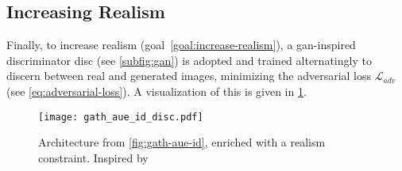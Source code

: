\subsection{Increasing Realism}
Finally, to increase realism (goal~\ref{goal:increase-realism}), a \gls{gan}-inspired
discriminator \gls{disc} (see \cref{subfig:gan}) is adopted and trained alternatingly
to discern between real and generated images, minimizing the adversarial loss
\(\mathcal{L}_{adv}\)  (see \cref{eq:adversarial-loss}). A visualization of this
is given in \cref{fig:gath-aue-id-disc}.
\begin{figure}[htp]
    \vspace{-1em}
    \center{}
    \texttt{[image: gath\_aue\_id\_disc.pdf]}
    \caption{Architecture from \cref{fig:gath-aue-id}, enriched with a realism
    constraint. Inspired by~\cite{Mirsky.2020, Pham.2018}}\label{fig:gath-aue-id-disc}
    \vspace{-3em}
\end{figure}